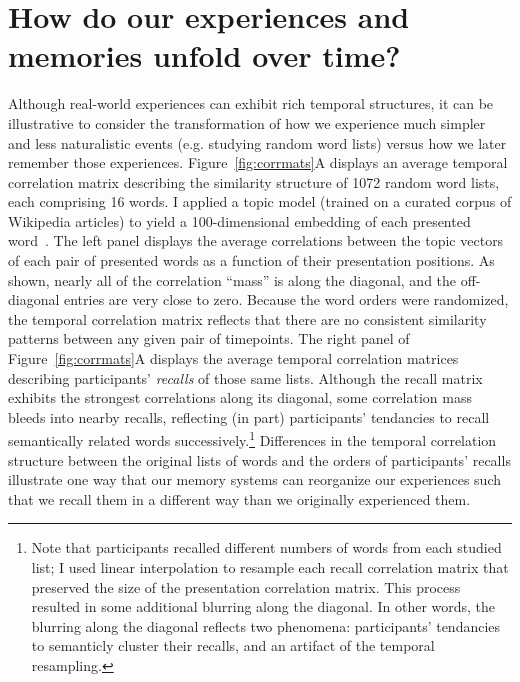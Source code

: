 \documentclass{article}
\begin{document}
\section*{How do our experiences and memories unfold over time?}
Although real-world experiences can exhibit rich temporal structures, it can be illustrative to consider the transformation of how we experience much simpler and less naturalistic events (e.g. studying random word lists) versus how we later remember those experiences.  Figure~\ref{fig:corrmats}A displays an average temporal correlation matrix describing the similarity structure of 1072 random word lists, each comprising 16 words.  I applied a topic model (trained on a curated corpus of Wikipedia articles) to yield a 100-dimensional embedding of each presented word~\citep{BleiEtal03}.  The left panel displays the average correlations between the topic vectors of each pair of presented words as a function of their presentation positions.  As shown, nearly all of the correlation ``mass'' is along the diagonal, and the off-diagonal entries are very close to zero.  Because the word orders were randomized, the temporal correlation matrix reflects that there are no consistent similarity patterns between any given pair of timepoints.  The right panel of Figure~\ref{fig:corrmats}A displays the average temporal correlation matrices describing participants' \textit{recalls} of those same lists.  Although the recall matrix exhibits the strongest correlations along its diagonal, some correlation mass bleeds into nearby recalls, reflecting (in part) participants' tendancies to recall semantically related words successively.\footnote{Note that participants recalled different numbers of words from each studied list; I used linear interpolation to resample each recall correlation matrix that preserved the size of the presentation correlation matrix.  This process resulted in some additional blurring along the diagonal.  In other words, the blurring along the diagonal reflects two phenomena: participants' tendancies to semanticly cluster their recalls, and an artifact of the temporal resampling.}  Differences in the temporal correlation structure between the original lists of words and the orders of participants' recalls illustrate one way that our memory systems can reorganize our experiences such that we recall them in a different way than we originally experienced them.
\end{document}
